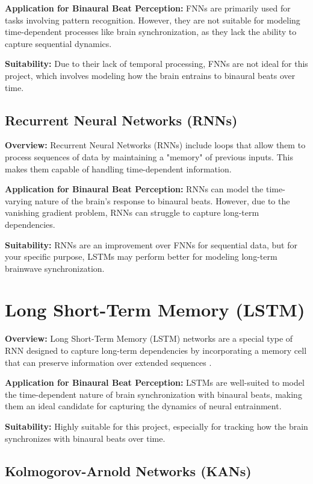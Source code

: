 \documentclass{article}
\begin{document}
\textbf{Application for Binaural Beat Perception:} FNNs are primarily used for tasks involving pattern recognition. However, they are not suitable for modeling time-dependent processes like brain synchronization, as they lack the ability to capture sequential dynamics.

\textbf{Suitability:} Due to their lack of temporal processing, FNNs are not ideal for this project, which involves modeling how the brain entrains to binaural beats over time.

\subsection{Recurrent Neural Networks (RNNs)}

\textbf{Overview:} Recurrent Neural Networks (RNNs) include loops that allow them to process sequences of data by maintaining a "memory" of previous inputs. This makes them capable of handling time-dependent information.

\textbf{Application for Binaural Beat Perception:} RNNs can model the time-varying nature of the brain’s response to binaural beats. However, due to the vanishing gradient problem, RNNs can struggle to capture long-term dependencies.

\textbf{Suitability:} RNNs are an improvement over FNNs for sequential data, but for your specific purpose, LSTMs may perform better for modeling long-term brainwave synchronization.

\section{Long Short-Term Memory (LSTM)}

\textbf{Overview:} Long Short-Term Memory (LSTM) networks are a special type of RNN designed to capture long-term dependencies by incorporating a memory cell that can preserve information over extended sequences \cite{hochreiter1997long}.

\textbf{Application for Binaural Beat Perception:} LSTMs are well-suited to model the time-dependent nature of brain synchronization with binaural beats, making them an ideal candidate for capturing the dynamics of neural entrainment.

\textbf{Suitability:} Highly suitable for this project, especially for tracking how the brain synchronizes with binaural beats over time.

\subsection{Kolmogorov-Arnold Networks (KANs)}
\end{document}
